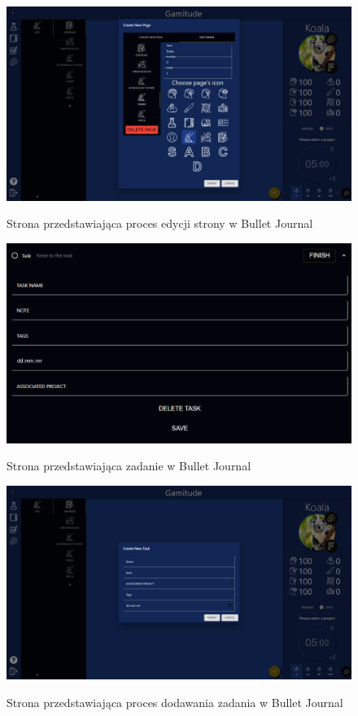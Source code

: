 \documentclass[a4paper,11pt]{report}
\begin{document}
\begin{figure}[H]
	\centering
	\includegraphics[scale=0.3]{prezentacja/Page_edit}\\
	\caption{Strona przedstawiająca proces edycji strony w Bullet Journal}
	\label{fig:Page_edit}
\end{figure}
\begin{figure}[H]
	\centering
	\includegraphics[scale=0.3]{prezentacja/ProjectTask}\\
	\caption{Strona przedstawiająca zadanie w Bullet Journal}
	\label{fig:ProjectTask}
\end{figure}
\begin{figure}[H]
	\centering
	\includegraphics[scale=0.3]{prezentacja/ProjectTask_add}\\
	\caption{Strona przedstawiająca proces dodawania zadania w Bullet Journal}
	\label{fig:ProjectTask_add}
\end{figure}
\end{document}
